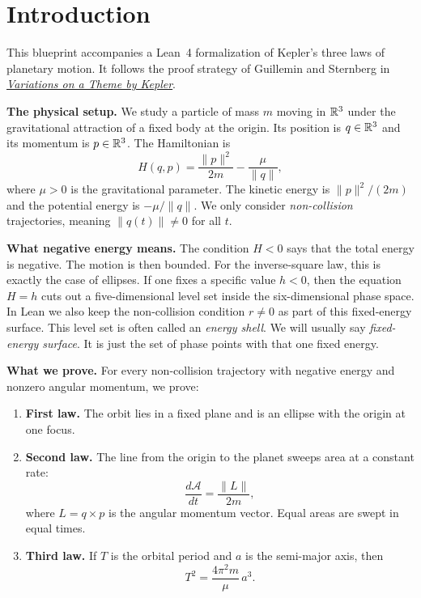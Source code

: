 
\chapter{Introduction}

This blueprint accompanies a Lean~4 formalization of Kepler's three laws of planetary motion.
It follows the proof strategy of Guillemin and Sternberg in
\href{https://bookstore.ams.org/COLL/42}{\emph{Variations on a Theme by Kepler}}.

\medskip
\noindent\textbf{The physical setup.}
We study a particle of mass $m$ moving in $\mathbb{R}^3$ under the gravitational attraction of a fixed body at the origin.
Its position is $q \in \mathbb{R}^3$ and its momentum is $p \in \mathbb{R}^3$.
The Hamiltonian is
\[
  H(q,p) = \frac{\|p\|^2}{2m} - \frac{\mu}{\|q\|},
\]
where $\mu > 0$ is the gravitational parameter.
The kinetic energy is $\|p\|^2/(2m)$ and the potential energy is $-\mu/\|q\|$.
We only consider \emph{non-collision} trajectories, meaning $\|q(t)\| \neq 0$ for all $t$.

\medskip
\noindent\textbf{What negative energy means.}
The condition $H < 0$ says that the total energy is negative.
The motion is then bounded.
For the inverse-square law, this is exactly the case of ellipses.
If one fixes a specific value $h < 0$, then the equation $H = h$ cuts out a five-dimensional level set inside the six-dimensional phase space.
In Lean we also keep the non-collision condition $r \neq 0$ as part of this fixed-energy surface.
This level set is often called an \emph{energy shell}.
We will usually say \emph{fixed-energy surface}.
It is just the set of phase points with that one fixed energy.

\medskip
\noindent\textbf{What we prove.}
For every non-collision trajectory with negative energy and nonzero angular momentum, we prove:

\begin{enumerate}
  \item \textbf{First law.}
    The orbit lies in a fixed plane and is an ellipse with the origin at one focus.
  \item \textbf{Second law.}
    The line from the origin to the planet sweeps area at a constant rate:
    \[
      \frac{d\mathcal{A}}{dt} = \frac{\|L\|}{2m},
    \]
    where $L = q \times p$ is the angular momentum vector.
    Equal areas are swept in equal times.
  \item \textbf{Third law.}
    If $T$ is the orbital period and $a$ is the semi-major axis, then
    \[
      T^2 = \frac{4\pi^2 m}{\mu}\,a^3.
    \]
\end{enumerate}

